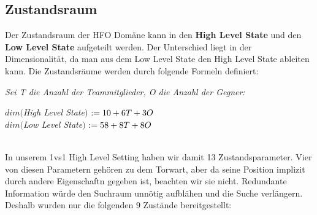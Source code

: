         \subsection{Zustandsraum} \label{statespace-definition}
            Der Zustandsraum der HFO Domäne kann in den \textbf{High Level State} und den \textbf{Low Level State} aufgeteilt werden. Der Unterschied liegt in der Dimensionalität, da man aus dem Low Level State den High Level State ableiten kann. Die Zustandsräume werden durch folgende Formeln definiert:\\
            
            \begin{mdframed}
            \textit{Sei T die Anzahl der Teammitglieder, O die Anzahl der Gegner:}
            \begin{center}
                $dim($\textit{High Level State}$)$ $ := 10 + 6T + 3O \hspace{10mm} $ \\
                $dim($\textit{Low Level State}$)$  $ := 58 + 8T + 8O \hspace{9mm} $ \\
            \end{center}
            \end{mdframed}
            \hfill  \\
            In unserem 1vs1 High Level Setting haben wir damit 13 Zustandsparameter. Vier von diesen Parametern gehören zu dem Torwart, aber da seine Position implizit durch andere Eigenschaftn gegeben ist, beachten wir sie nicht. Redundante Information würde den Suchraum unnötig aufblähen und die Suche verlängern. Deshalb wurden nur die folgenden 9 Zustände bereitgestellt:



